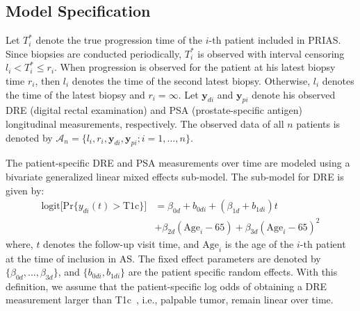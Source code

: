 \clearpage
\subsection{Model Specification}
Let $T_i^*$ denote the true progression time of the ${i\mbox{-th}}$ patient included in PRIAS. Since biopsies are conducted periodically, $T_i^*$ is observed with interval censoring ${l_i < T_i^* \leq r_i}$. When progression is observed for the patient at his latest biopsy time $r_i$, then $l_i$ denotes the time of the second latest biopsy. Otherwise, $l_i$ denotes the time of the latest biopsy and ${r_i=\infty}$. Let $\boldsymbol{y}_{di}$ and $\boldsymbol{y}_{pi}$ denote his observed DRE (digital rectal examination) and PSA (prostate-specific antigen) longitudinal measurements, respectively. The observed data of all $n$ patients is denoted by ${\mathcal{A}_n = \{l_i, r_i, \boldsymbol{y}_{di}, \boldsymbol{y}_{pi}; i = 1, \ldots, n\}}$.

The patient-specific DRE and PSA measurements over time are modeled using a bivariate generalized linear mixed effects sub-model. The sub-model for DRE is given by:
\begin{equation}
\label{eq:long_model_dre}
\begin{split}
    \mbox{logit} \big[\mbox{Pr}\{y_{di}(t) > \mbox{T1c}\}\big] &= \beta_{0d} + b_{0di} + (\beta_{1d} + b_{1di}) t\\
    &+ \beta_{2d} (\mbox{Age}_i-65) + \beta_{3d} (\mbox{Age}_i-65)^2
    \end{split}
\end{equation}
where, $t$ denotes the follow-up visit time, and $\mbox{Age}_i$ is the age of the ${i\mbox{-th}}$ patient at the time of inclusion in AS. The fixed effect parameters are denoted by ${\{\beta_{0d}, \ldots, \beta_{3d}\}}$, and ${\{b_{0di}, b_{1di}\}}$ are the patient specific random effects. With this definition, we assume that the patient-specific log odds of obtaining a DRE measurement larger than T1c~\citep{schroder1992tnm}, i.e., palpable tumor, remain linear over time.

